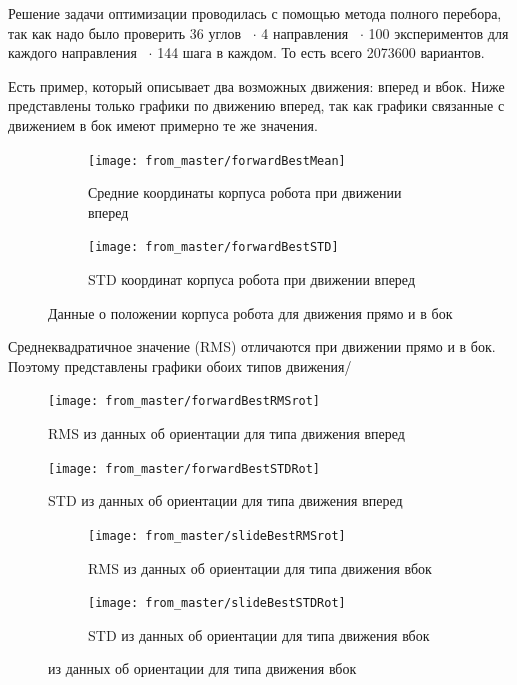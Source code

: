 Решение задачи оптимизации проводилась с помощью метода полного перебора, так как надо было проверить 36 углов ~$\cdot$ 4 направления ~$\cdot$ 100 экспериментов для каждого направления ~$\cdot$ 144 шага в каждом. То есть всего 2073600 вариантов.

Есть пример, который описывает два возможных движения: вперед и вбок. Ниже представлены только графики по движению вперед, так как графики связанные с движением в бок имеют примерно те же значения.

\begin{figure}[H]
\begin{subfigure}{1\textwidth}
\centering\texttt{[image: from\_master/forwardBestMean]} 
\caption{Средние координаты корпуса робота при движении вперед}
\label{fig:forwardBestMean}
\end{subfigure}

\begin{subfigure}{1\textwidth}
\centering\texttt{[image: from\_master/forwardBestSTD]} 
\caption{STD координат корпуса робота при движении вперед}
\label{fig:forwardBestSTD}
\end{subfigure}
 
\caption{Данные о положении корпуса робота для движения прямо и в бок}
\label{fig:forwardPosion}
\end{figure}

Среднеквадратичное значение (RMS) отличаются при движении прямо и в бок. Поэтому представлены графики обоих типов движения/

\begin{figure}[H]
\centering\texttt{[image: from\_master/forwardBestRMSrot]} 
\caption{RMS из данных об ориентации для типа движения вперед}
\label{fig:forwardBestRMSrot}
\end{figure}

\begin{figure}[H]
\centering\texttt{[image: from\_master/forwardBestSTDRot]} 
\caption{STD из данных об ориентации для типа движения вперед}
\label{fig:forwardBestSTDRot}
\end{figure}

\begin{figure}[H]
\begin{subfigure}{1\textwidth}
\centering\texttt{[image: from\_master/slideBestRMSrot]} 
\caption{RMS из данных об ориентации для типа движения вбок}
\label{fig:slideBestRMSrot}
\end{subfigure}

\begin{subfigure}{1\textwidth}
\centering\texttt{[image: from\_master/slideBestSTDRot]} 
\caption{STD из данных об ориентации для типа движения вбок}
\label{fig:slideBestSTDRot}
\end{subfigure}
 
\caption{из данных об ориентации для типа движения вбок}
\label{fig:slideOrientation}
\end{figure}

